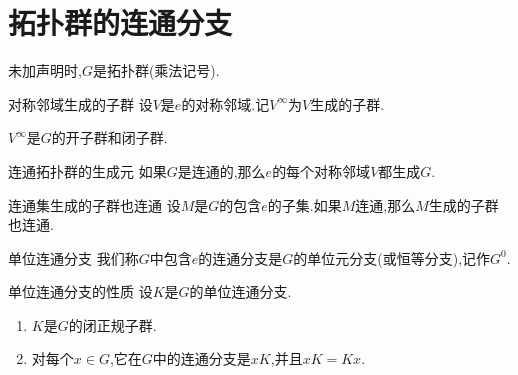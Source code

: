\section{拓扑群的连通分支}

未加声明时,$G$是拓扑群(乘法记号).

\begin{definition}{对称邻域生成的子群}{}
	设$V$是$e$的对称邻域.记$V^{\infty}$为$V$生成的子群.
\end{definition}

\begin{remark}{}{}
	$V^{\infty}$是$G$的开子群和闭子群.
\end{remark}

\begin{proposition}{连通拓扑群的生成元}{}
	如果$G$是连通的,那么$e$的每个对称邻域$V$都生成$G$.
\end{proposition}

\begin{proposition}{连通集生成的子群也连通}{}
	设$M$是$G$的包含$e$的子集.如果$M$连通,那么$M$生成的子群也连通.
\end{proposition}

\begin{definition}{单位连通分支}{}
	我们称$G$中包含$e$的连通分支是$G$的单位元分支(或恒等分支),记作$G^{0}$.
\end{definition}

\begin{proposition}{单位连通分支的性质}{}
	设$K$是$G$的单位连通分支.
	\begin{enumerate}
		\item $K$是$G$的闭正规子群.
		\item 对每个$x\in G$,它在$G$中的连通分支是$xK$,并且$xK=Kx$.
	\end{enumerate}
\end{proposition}
